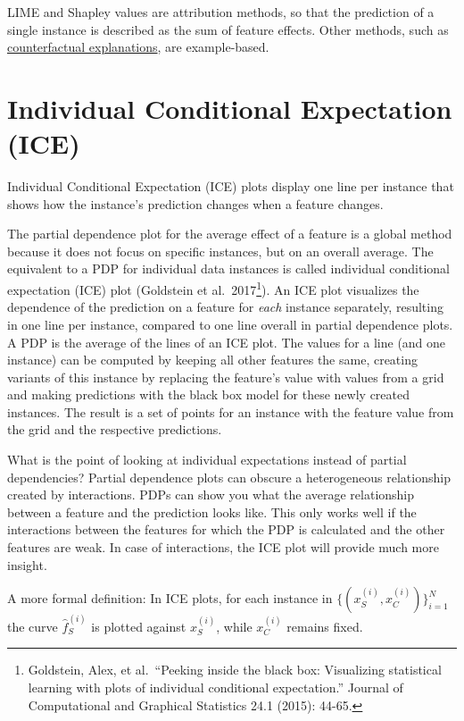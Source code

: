 \documentclass[
  12pt,
]{krantz}
\begin{document}
LIME and Shapley values are attribution methods, so that the prediction of a single instance is described as the sum of feature effects.
Other methods, such as \protect\hyperlink{counterfactual}{counterfactual explanations}, are example-based.

\newpage

\hypertarget{ice}{%
\section{Individual Conditional Expectation (ICE)}\label{ice}}

Individual Conditional Expectation (ICE) plots display one line per instance that shows how the instance's prediction changes when a feature changes.

The partial dependence plot for the average effect of a feature is a global method because it does not focus on specific instances, but on an overall average.
The equivalent to a PDP for individual data instances is called individual conditional expectation (ICE) plot (Goldstein et al.~2017\footnote{Goldstein, Alex, et al.~``Peeking inside the black box: Visualizing statistical learning with plots of individual conditional expectation.'' Journal of Computational and Graphical Statistics 24.1 (2015): 44-65.}).
An ICE plot visualizes the dependence of the prediction on a feature for \emph{each} instance separately, resulting in one line per instance, compared to one line overall in partial dependence plots.
A PDP is the average of the lines of an ICE plot.
The values for a line (and one instance) can be computed by keeping all other features the same, creating variants of this instance by replacing the feature's value with values from a grid and making predictions with the black box model for these newly created instances.
The result is a set of points for an instance with the feature value from the grid and the respective predictions.

What is the point of looking at individual expectations instead of partial dependencies?
Partial dependence plots can obscure a heterogeneous relationship created by interactions.
PDPs can show you what the average relationship between a feature and the prediction looks like.
This only works well if the interactions between the features for which the PDP is calculated and the other features are weak.
In case of interactions, the ICE plot will provide much more insight.

A more formal definition:
In ICE plots, for each instance in \(\{(x_{S}^{(i)},x_{C}^{(i)})\}_{i=1}^N\) the curve \(\hat{f}_S^{(i)}\) is plotted against \(x^{(i)}_{S}\), while \(x^{(i)}_{C}\) remains fixed.
\end{document}
